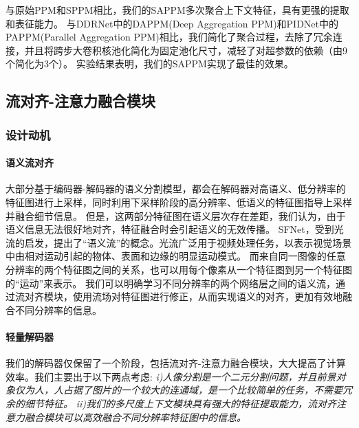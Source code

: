 \documentclass[11pt]{article}
\begin{document}
与原始PPM和SPPM相比，我们的SAPPM多次聚合上下文特征，具有更强的提取和表征能力。
与DDRNet中的DAPPM(Deep Aggregation PPM)和PIDNet中的PAPPM(Parallel Aggregation PPM)相比，我们简化了聚合过程，去除了冗余连接，并且将跨步大卷积核池化简化为固定池化尺寸，减轻了对超参数的依赖（由9个简化为3个）。
实验结果表明，我们的SAPPM实现了最佳的效果。


\subsection{流对齐-注意力融合模块}

\subsubsection{设计动机}
\paragraph{语义流对齐}
大部分基于编码器-解码器的语义分割模型，都会在解码器对高语义、低分辨率的特征图进行上采样，同时利用下采样阶段的高分辨率、低语义的特征图指导上采样并融合细节信息。
但是，这两部分特征图在语义层次存在差距，我们认为，由于语义信息无法很好地对齐，特征融合时会引起语义的无效传播。
SFNet\cite{ref34}，受到光流的启发，提出了“语义流”的概念。光流广泛用于视频处理任务，以表示视觉场景中由相对运动引起的物体、表面和边缘的明显运动模式。
而来自同一图像的任意分辨率的两个特征图之间的关系，也可以用每个像素从一个特征图到另一个特征图的“运动”来表示。
我们可以明确学习不同分辨率的两个网络层之间的语义流，通过流对齐模块，使用流场对特征图进行修正，从而实现语义的对齐，更加有效地融合不同分辨率的信息。

\paragraph{轻量解码器}
我们的解码器仅保留了一个阶段，包括流对齐-注意力融合模块，大大提高了计算效率。我们主要出于以下两点考虑:
\textit{i)人像分割是一个二元分割问题，并且前景对象仅为人，人占据了图片的一个较大的连通域，是一个比较简单的任务，不需要冗余的细节特征。}
\textit{ii)我们的多尺度上下文模块具有强大的特征提取能力，流对齐注意力融合模块可以高效融合不同分辨率特征图中的信息。}
\end{document}
